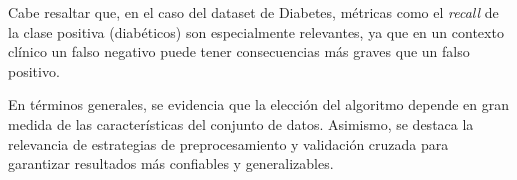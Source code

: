 \documentclass[a4paper,12pt]{article}
\begin{document}
Cabe resaltar que, en el caso del dataset de Diabetes, métricas como el \textit{recall} de la clase positiva (diabéticos) son especialmente relevantes, ya que en un contexto clínico un falso negativo puede tener consecuencias más graves que un falso positivo.

En términos generales, se evidencia que la elección del algoritmo depende en 
gran medida de las características del conjunto de datos. Asimismo, se destaca 
la relevancia de estrategias de preprocesamiento y validación cruzada para 
garantizar resultados más confiables y generalizables.
\end{document}
